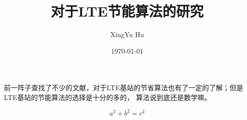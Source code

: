 \documentclass{article}
\author{XingYu Hu}
\title{对于LTE节能算法的研究}
\date{\today}
\begin{document}
\maketitle
前一阵子查找了不少的文献，对于LTE基站的节省算法也有了一定的了解；但是LTE基站的节能算法的选择是十分的多的，
算法说到底还是数学嘛。


\begin{equation}
  a^2+b^2=c^2
\end{equation}



\end{document}
